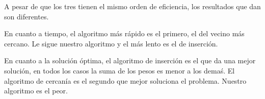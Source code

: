 \documentclass[a4]{article}
\begin{document}
A pesar de que los tres tienen el mismo orden de eficiencia, los
resultados que dan son diferentes.

En cuanto a tiempo, el algoritmo más rápido es el primero, el del
vecino más cercano. Le sigue nuestro algoritmo y el más lento es el de
inserción.

En cuanto a la solución óptima, el algoritmo de inserción es el que da
una mejor solución, en todos los casos la suma de los pesos es menor a
los demaś. El algoritmo de cercanía es el segundo que mejor soluciona
el problema. Nuestro algoritmo es el peor.

\begin{figure}[H]
  \centering
{}
\end{figure}
\end{document}
